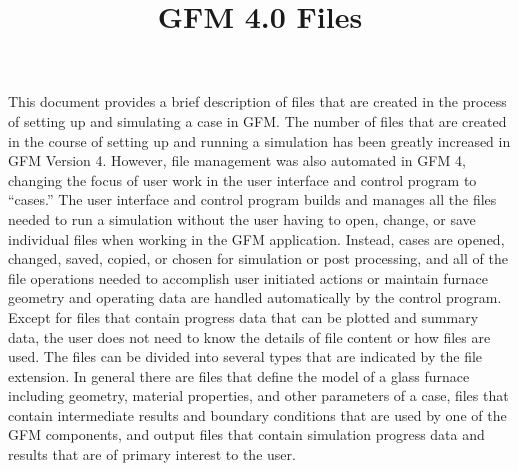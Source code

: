 \documentclass[twoside,12pt]{article}
\title{ \bf GFM 4.0 Files}
\date{}
\numberwithin{equation}{section}
\begin{document}
\maketitle



This document provides a brief description of files that are created in the process of setting up and simulating a case in GFM. The number of files that are created in the course of setting up and running a simulation has been greatly increased in GFM Version 4. However, file management was also automated in GFM 4, changing the focus of user work in the user interface and control program to ``cases.'' The user interface and control program builds and manages all the files needed to run a simulation without the user having to open, change, or save individual files when working in the GFM application. Instead, cases are opened, changed, saved, copied, or chosen for simulation or post processing, and all of the file operations needed to accomplish user initiated actions or maintain furnace geometry and operating data are handled automatically by the control program. Except for files that contain progress data that can be plotted and summary data, the user does not need to know the details of file content or how files are used.  The files can be divided into several types that are indicated by the file extension. In general there are files that define the model of a glass furnace including geometry, material properties, and other parameters of a case, files that contain intermediate results and boundary conditions that are used by one of the GFM components, and output files that contain simulation progress data and results that are of primary interest to the user.
\end{document}
